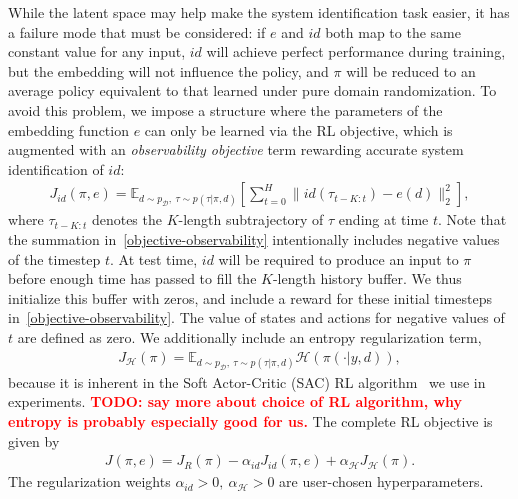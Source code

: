 \documentclass{article}
\newcommand{\E}{\mathbb{E}}
\newcommand{\TODO}[1]{\textcolor{red}{\textbf{TODO: #1}}}
\newcommand{\cH}{\mathcal{H}}
\newcommand{\cN}{\mathcal{N}}
\newcommand{\embedfn}{e}
\newcommand{\idfn}{id}
\newcommand{\idset}{\mathcal{D}}
\newcommand{\obvar}{y}
\newcommand{\idvar}{d}
\newcommand{\idpdf}{p_{\idset}}
\begin{document}
While the latent space may help make the system identification task easier,
it has a failure mode that must be considered:
if $\embedfn$ and $\idfn$ both map to the same constant value for any input,
$\idfn$ will achieve perfect performance during training,
but the embedding will not influence the policy, and $\pi$ will be reduced to an average policy
equivalent to that learned under pure domain randomization.
To avoid this problem, we impose a structure where the parameters of the embedding function $e$
can only be learned via the RL objective, which is augmented with an \emph{observability objective} term
rewarding accurate system identification of $id$:
\begin{equation}\begin{split}
J_{\idfn}(\pi, \embedfn) =
\E_{\idvar \sim \idpdf,\ \tau \sim p(\tau|\pi,\idvar)}
\left[
\sum_{t = 0}^{H} \| \idfn(\tau_{t-K:t}) - \embedfn(\idvar) \|_2^2
\right],
\label{objective-observability}
\end{split}\end{equation}
where $\tau_{t-K:t}$ denotes the $K$-length subtrajectory of $\tau$ ending at time $t$.
Note that the summation in~\eqref{objective-observability} intentionally includes negative values of the timestep $t$.
At test time, $\idfn$ will be required to produce an input to $\pi$
before enough time has passed to fill the $K$-length history buffer.
We thus initialize this buffer with zeros, and include a reward for these initial timesteps in~\eqref{objective-observability}.
The value of states and actions for negative values of $t$ are defined as zero.
We additionally include an entropy regularization term,
\begin{equation}\begin{split}
J_{\cH}(\pi) =
\E_{\idvar \sim \idpdf,\ \tau \sim p(\tau|\pi,\idvar)}
\cH(\pi(\cdot |\obvar, \idvar)),
\label{objective-entropy}
\end{split}\end{equation}
because it is inherent in the Soft Actor-Critic (SAC) RL algorithm~\citep{haarnoja-soft-actor-critic} we use in experiments.
\TODO{say more about choice of RL algorithm, why entropy is probably especially good for us.}
The complete RL objective is given by
\begin{equation}\begin{split}
J(\pi, \embedfn) = J_R(\pi) - \alpha_{id} J_{\idfn}(\pi, \embedfn) + \alpha_{\cH} J_{\cH}(\pi).
\label{objective-full}
\end{split}\end{equation}
The regularization weights $\alpha_{id} > 0,\ \alpha_{\cH} > 0$ are user-chosen hyperparameters.
\end{document}

